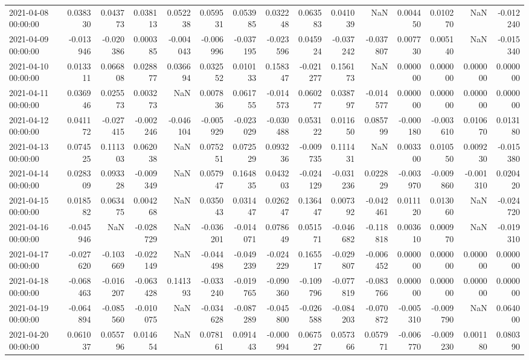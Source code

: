 \begin{tabular}{lrrrrrrrrrrrrrr}
2021-04-08 00:00:00 & 0.038330 & 0.043773 & 0.038113 & 0.052238 & 0.059531 & 0.053985 & 0.032248 & 0.063583 & 0.041039 & NaN & 0.004450 & 0.010270 & NaN & -0.012240 \\
2021-04-09 00:00:00 & -0.013946 & -0.020386 & 0.000385 & -0.004043 & -0.006996 & -0.037195 & -0.023596 & 0.045924 & -0.037242 & -0.037807 & 0.007730 & 0.005140 & NaN & -0.015340 \\
2021-04-10 00:00:00 & 0.013311 & 0.066808 & 0.028877 & 0.036694 & 0.032552 & 0.010133 & 0.158347 & -0.021277 & 0.156173 & NaN & 0.000000 & 0.000000 & 0.000000 & 0.000000 \\
2021-04-11 00:00:00 & 0.036946 & 0.025573 & 0.003273 & NaN & 0.007836 & 0.061755 & -0.014573 & 0.060277 & 0.038797 & -0.014577 & 0.000000 & 0.000000 & 0.000000 & 0.000000 \\
2021-04-12 00:00:00 & 0.041172 & -0.027415 & -0.002246 & -0.046104 & -0.005929 & -0.023029 & -0.030488 & 0.053122 & 0.011650 & 0.085799 & -0.000180 & -0.003610 & 0.010670 & 0.013180 \\
2021-04-13 00:00:00 & 0.074525 & 0.111303 & 0.062038 & NaN & 0.075251 & 0.072529 & 0.093236 & -0.009735 & 0.111431 & NaN & 0.003300 & 0.010550 & 0.009230 & -0.015380 \\
2021-04-14 00:00:00 & 0.028309 & 0.093328 & -0.009349 & NaN & 0.057947 & 0.164835 & 0.043203 & -0.024129 & -0.031236 & 0.022829 & -0.003970 & -0.009860 & -0.001310 & 0.020420 \\
2021-04-15 00:00:00 & 0.018582 & 0.063475 & 0.004268 & NaN & 0.035043 & 0.031447 & 0.026247 & 0.136447 & 0.007392 & -0.042461 & 0.011120 & 0.013060 & NaN & -0.024720 \\
2021-04-16 00:00:00 & -0.045946 & NaN & -0.028729 & NaN & -0.036201 & -0.014071 & 0.078649 & 0.051571 & -0.046682 & -0.118818 & 0.003610 & 0.000970 & NaN & -0.019310 \\
2021-04-17 00:00:00 & -0.027620 & -0.103669 & -0.022149 & NaN & -0.044498 & -0.049239 & -0.024229 & 0.165517 & -0.029807 & -0.006452 & 0.000000 & 0.000000 & 0.000000 & 0.000000 \\
2021-04-18 00:00:00 & -0.068463 & -0.016207 & -0.063428 & 0.141393 & -0.033240 & -0.019765 & -0.090360 & -0.109796 & -0.077819 & -0.083766 & 0.000000 & 0.000000 & 0.000000 & 0.000000 \\
2021-04-19 00:00:00 & -0.064894 & -0.085560 & -0.010075 & NaN & -0.034628 & -0.087289 & -0.045800 & -0.026588 & -0.084203 & -0.070872 & -0.005310 & -0.009790 & NaN & 0.064000 \\
2021-04-20 00:00:00 & 0.061037 & 0.055796 & 0.014654 & NaN & 0.078161 & 0.091443 & -0.000994 & 0.067527 & 0.057366 & 0.057971 & -0.006770 & -0.009230 & 0.001180 & 0.080390 \\

\end{tabular}
